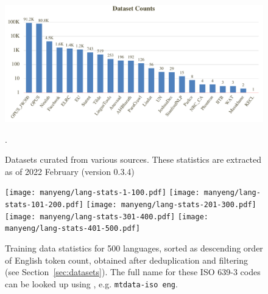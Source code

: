 \begin{figure}[ht]
    \centering
    \includegraphics[width=\linewidth]{img/manyeng/mtdata-stats.pdf}
    \caption{Datasets curated from various sources. These statistics are extracted as of 2022 February (version 0.3.4)}.
    \label{fig:mtdata-stats}
\end{figure}

\begin{figure}[h!t]
\centering
    \texttt{[image: manyeng/lang-stats-1-100.pdf]}
    \texttt{[image: manyeng/lang-stats-101-200.pdf]}
    \texttt{[image: manyeng/lang-stats-201-300.pdf]}
    \texttt{[image: manyeng/lang-stats-301-400.pdf]}
    \texttt{[image: manyeng/lang-stats-401-500.pdf]}     
    \caption{Training data statistics for 500 languages, sorted as descending order of English token count,  obtained after deduplication and filtering (see Section~\ref{sec:datasets}). The full name for these ISO 639-3 codes can be looked up using \mtdata, e.g. \texttt{mtdata-iso eng}.}
       \label{fig:train-data-stats}
\end{figure}



